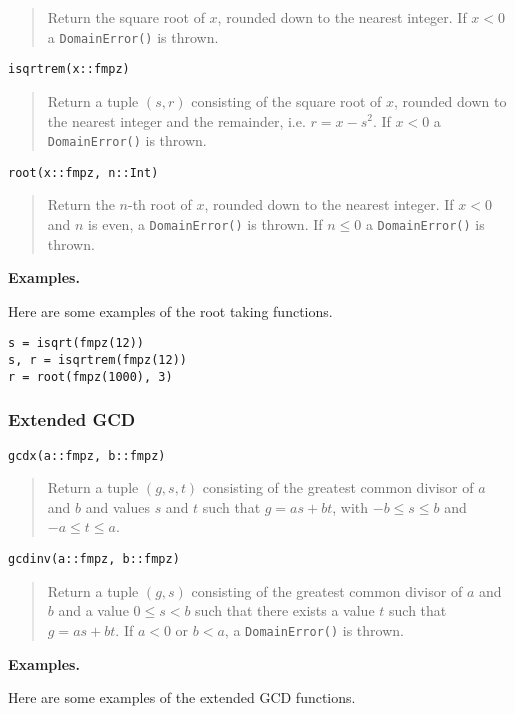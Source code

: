 \documentclass[a4paper,10pt]{article}
\newcommand{\code}{\lstinline}
\newcommand{\desc}[1]{\vspace{-3mm}\begin{quote}#1\end{quote}}
\begin{document}
{{\desc{Return the square root of $x$, rounded down to the nearest integer. If $x < 0$
a \code{DomainError()} is thrown.}

\begin{lstlisting}
isqrtrem(x::fmpz)
\end{lstlisting}

\desc{Return a tuple $(s, r)$ consisting of the square root of $x$, rounded down to the 
nearest integer and the remainder, i.e. $r = x - s^2$. If $x < 0$ a \code{DomainError()}
is thrown.}

\begin{lstlisting}
root(x::fmpz, n::Int)
\end{lstlisting}

\desc{Return the $n$-th root of $x$, rounded down to the nearest integer. If $x < 0$ and
$n$ is even, a \code{DomainError()} is thrown. If $n \leq 0$ a \code{DomainError()} is
thrown.}

\textbf{Examples.}

Here are some examples of the root taking functions.

\begin{lstlisting}
s = isqrt(fmpz(12))
s, r = isqrtrem(fmpz(12))
r = root(fmpz(1000), 3)
\end{lstlisting}

\subsubsection{Extended GCD}

\begin{lstlisting}
gcdx(a::fmpz, b::fmpz)
\end{lstlisting}

\desc{Return a tuple $(g, s, t)$ consisting of the greatest common divisor of $a$ and $b$
and values $s$ and $t$ such that $g = as + bt$, with $-b \leq s \leq b$ and 
$-a \leq t \leq a$.}

\begin{lstlisting}
gcdinv(a::fmpz, b::fmpz)
\end{lstlisting}

\desc{Return a tuple $(g, s)$ consisting of the greatest common divisor of $a$ and $b$
and a value $0 \leq s < b$ such that there exists a value $t$ such that 
$g = as + bt$. If $a < 0$ or $b < a$, a \code{DomainError()} is thrown.}

\textbf{Examples.}

Here are some examples of the extended GCD functions.

}}
\end{document}
